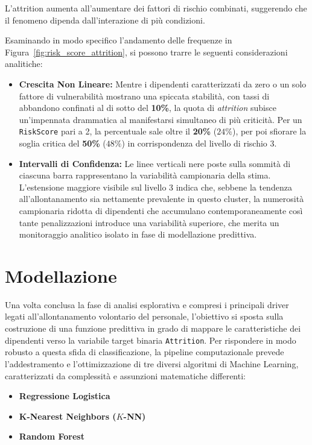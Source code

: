 \documentclass[11pt,a4paper]{article}
\begin{document}
L'attrition aumenta all'aumentare dei fattori di rischio combinati, suggerendo che il fenomeno dipenda dall'interazione di più condizioni. 

Esaminando in modo specifico l'andamento delle frequenze in Figura~\ref{fig:risk_score_attrition}, si possono trarre le seguenti considerazioni analitiche:
\begin{itemize}
    \item \textbf{Crescita Non Lineare:} Mentre i dipendenti caratterizzati da zero o un solo fattore di vulnerabilità mostrano una spiccata stabilità, con tassi di abbandono confinati al di sotto del \textbf{10\%}, la quota di \textit{attrition} subisce un'impennata drammatica al manifestarsi simultaneo di più criticità. Per un \texttt{RiskScore} pari a 2, la percentuale sale oltre il \textbf{20\%} ($24\%$), per poi sfiorare la soglia critica del \textbf{50\%} ($48\%$) in corrispondenza del livello di rischio 3.
    \item \textbf{Intervalli di Confidenza:} Le linee verticali nere poste sulla sommità di ciascuna barra rappresentano la variabilità campionaria della stima. L'estensione maggiore visibile sul livello 3 indica che, sebbene la tendenza all'allontanamento sia nettamente prevalente in questo cluster, la numerosità campionaria ridotta di dipendenti che accumulano contemporaneamente così tante penalizzazioni introduce una variabilità superiore, che merita un monitoraggio analitico isolato in fase di modellazione predittiva.
\end{itemize}

\section{Modellazione}
Una volta conclusa la fase di analisi esplorativa e compresi i principali driver legati all'allontanamento volontario del personale, l'obiettivo si sposta sulla costruzione di una funzione predittiva in grado di mappare le caratteristiche dei dipendenti verso la variabile target binaria \texttt{Attrition}. Per rispondere in modo robusto a questa sfida di classificazione, la pipeline computazionale prevede l'addestramento e l'ottimizzazione di tre diversi algoritmi di Machine Learning, caratterizzati da complessità e assunzioni matematiche differenti:
\begin{itemize}
    \item \textbf{Regressione Logistica} 
    \item \textbf{K-Nearest Neighbors ($K$-NN)} 
    \item \textbf{Random Forest} 
\end{itemize}
\end{document}
